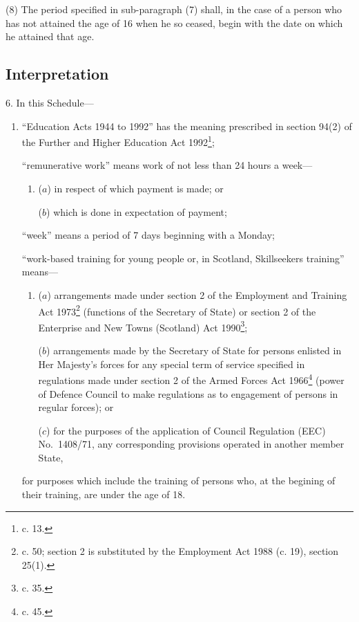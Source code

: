 \documentclass[a4paper,12pt]{article}
\begin{document}
(8) The period specified in sub-paragraph (7) shall, in the case of a person who has not attained the age of 16 when he so ceased, begin with the date on which he attained that age.

\subsection*{Interpretation}

6.  In this Schedule—
\begin{enumerate}\item[]
“Education Acts 1944 to 1992” has the meaning prescribed in section 94(2) of the Further and Higher Education Act 1992\footnote{ c. 13.};

“remunerative work” means work of not less than 24 hours a week—
\begin{enumerate}\item[]
($a$) in respect of which payment is made; or

($b$) which is done in expectation of payment;
\end{enumerate}

“week” means a period of 7 days beginning with a Monday;

“work-based training for young people or, in Scotland, Skillseekers training”  %
means—
\begin{enumerate}\item[]
($a$) arrangements made under section 2 of the Employment and Training Act 1973\footnote{ c. 50; section 2 is substituted by the Employment Act 1988 (c. 19), section 25(1).} (functions of the Secretary of State) or section 2 of the Enterprise and New Towns (Scotland) Act 1990\footnote{ c. 35.};

($b$) arrangements made by the Secretary of State for persons enlisted in Her Majesty’s forces for any special term of service specified in regulations made under section 2 of the Armed Forces Act 1966\footnote{ c. 45.} (power of Defence Council to make regulations as to engagement of persons in regular forces); or

($c$) for the purposes of the application of Council Regulation (EEC) No.\ 1408/71, any corresponding provisions operated in another member State,
\end{enumerate}
for purposes which include the training of persons who, at the begining of their training, are under the age of 18.
\end{enumerate}
\end{document}
